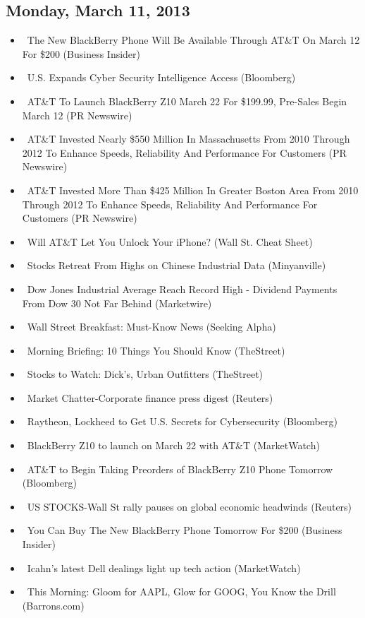 \documentclass[11pt,asymmetric]{article}
\begin{document}
\subsection*{Monday, March 11, 2013}
\begin{itemize}
\item\ The New BlackBerry Phone Will Be Available Through AT\&T On March 12 For \$200 (Business Insider)
\item\ U.S. Expands Cyber Security Intelligence Access (Bloomberg)
\item\ AT\&T To Launch BlackBerry Z10 March 22 For \$199.99, Pre-Sales Begin March 12 (PR Newswire)
\item\ AT\&T Invested Nearly \$550 Million In Massachusetts From 2010 Through 2012 To Enhance Speeds, Reliability And Performance For Customers (PR Newswire)
\item\ AT\&T Invested More Than \$425 Million In Greater Boston Area From 2010 Through 2012 To Enhance Speeds, Reliability And Performance For Customers (PR Newswire)
\item\ Will AT\&T Let You Unlock Your iPhone? (Wall St. Cheat Sheet)
\item\ Stocks Retreat From Highs on Chinese Industrial Data (Minyanville)
\item\ Dow Jones Industrial Average Reach Record High - Dividend Payments From Dow 30 Not Far Behind (Marketwire)
\item\ Wall Street Breakfast: Must-Know News (Seeking Alpha)
\item\ Morning Briefing: 10 Things You Should Know (TheStreet)
\item\ Stocks to Watch: Dick's, Urban Outfitters (TheStreet)
\item\ Market Chatter-Corporate finance press digest (Reuters)
\item\ Raytheon, Lockheed to Get U.S. Secrets for Cybersecurity (Bloomberg)
\item\ BlackBerry Z10 to launch on March 22 with AT\&T (MarketWatch)
\item\ AT\&T to Begin Taking Preorders of BlackBerry Z10 Phone Tomorrow (Bloomberg)
\item\ US STOCKS-Wall St rally pauses on global economic headwinds (Reuters)
\item\ You Can Buy The New BlackBerry Phone Tomorrow For \$200 (Business Insider)
\item\ Icahn’s latest Dell dealings light up tech action (MarketWatch)
\item\ This Morning: Gloom for AAPL, Glow for GOOG, You Know the Drill (Barrons.com)

\end{itemize}
\end{document}
